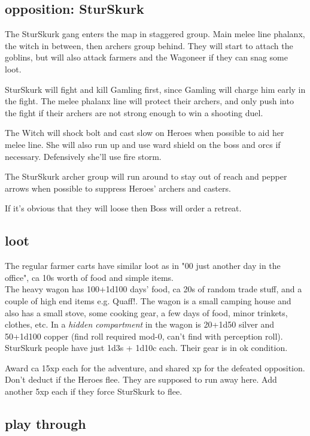\subsection*{opposition: SturSkurk}

The SturSkurk gang enters the map in staggered group. Main melee line phalanx, the witch in between, then archers group behind.
They will start to attach the goblins, but will also attack farmers and the Wagoneer if they can snag some loot.

SturSkurk will fight and kill Gamling first, since Gamling will charge him early in the fight. The melee phalanx line will protect their archers, and only push into the fight if their archers are not strong enough to win a shooting duel.

The Witch will shock bolt and cast slow on Heroes when possible to aid her melee line. She will also run up and use ward shield on the boss and orcs if necessary. Defensively she'll use fire storm.

The SturSkurk archer group will run around to stay out of reach and pepper arrows when possible to suppress Heroes' archers and casters.

If it's obvious that they will loose then Boss will order a retreat.


\subsection*{loot}

The regular farmer carts have similar loot as in "00 just another day in the office", ca 10s worth of food and simple items.\\
The heavy wagon has 100+1d100 days' food, ca 20s of random trade stuff, and a couple of high end items e.g. Quaff!. The wagon is a small camping house and also has a small stove, some cooking gear, a few days of food, minor trinkets, clothes, etc. In a \emph{hidden compartment} in the wagon is 20+1d50 silver and 50+1d100 copper (find roll required mod-0, can't find with perception roll).\\
SturSkurk people have just 1d3s + 1d10c each. Their gear is in ok condition.

Award ca 15xp each for the adventure, and shared xp for the defeated opposition. Don't deduct if the Heroes flee. They are supposed to run away here. Add another 5xp each if they force SturSkurk to flee.


\subsection*{play through}

